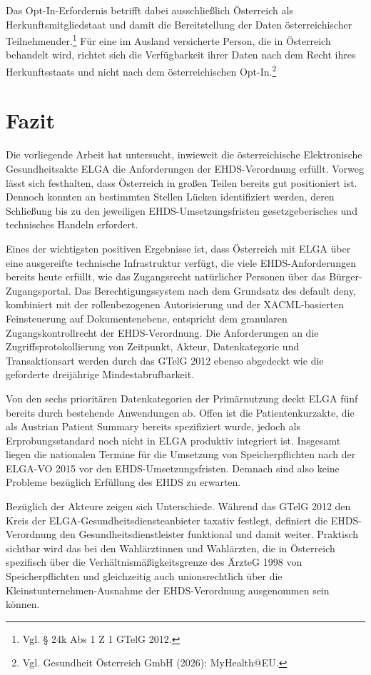 Das Opt-In-Erfordernis betrifft dabei ausschließlich Österreich als Herkunftsmitgliedstaat und damit die Bereitstellung der Daten österreichischer Teilnehmender.\footnote{Vgl. § 24k Abs 1 Z 1  GTelG 2012.} Für eine im Ausland versicherte Person, die in Österreich behandelt wird, richtet sich die Verfügbarkeit ihrer Daten nach dem Recht ihres Herkunftsstaats und nicht nach dem österreichischen Opt-In.\footnote{Vgl. Gesundheit Österreich GmbH (2026): MyHealth@EU.}




\chapter{Fazit}
Die vorliegende Arbeit hat untersucht, inwieweit die österreichische Elektronische Gesundheitsakte ELGA die Anforderungen der EHDS-Verordnung erfüllt. Vorweg lässt sich festhalten, dass Österreich in großen Teilen bereits gut positioniert ist. Dennoch konnten an bestimmten Stellen Lücken identifiziert werden, deren Schließung bis zu den jeweiligen EHDS-Umsetzungsfristen gesetzgeberisches und technisches Handeln erfordert.

Eines der wichtigsten positiven Ergebnisse ist, dass Österreich mit ELGA über eine ausgereifte technische Infrastruktur verfügt, die viele EHDS-Anforderungen bereits heute erfüllt, wie das Zugangsrecht natürlicher Personen über das Bürger-Zugangsportal.
Das Berechtigungssystem nach dem Grundsatz des default deny, kombiniert mit der rollenbezogenen Autorisierung und der XACML-basierten Feinsteuerung auf Dokumentenebene, entspricht dem granularen Zugangskontrollrecht der EHDS-Verordnung. Die Anforderungen an die Zugriffsprotokollierung von Zeitpunkt, Akteur, Datenkategorie und Transaktionsart werden durch das GTelG 2012 ebenso abgedeckt wie die geforderte dreijährige Mindestabrufbarkeit.

Von den sechs prioritären Datenkategorien der Primärnutzung deckt ELGA fünf bereits durch bestehende Anwendungen ab. Offen ist die Patientenkurzakte, die als Austrian Patient Summary bereits spezifiziert wurde, jedoch als Erprobungsstandard noch nicht in ELGA produktiv integriert ist. Insgesamt liegen die nationalen Termine für die Umsetzung von Speicherpflichten nach der ELGA-VO 2015 vor den EHDS-Umsetzungsfristen. Demnach sind also keine Probleme bezüglich Erfüllung des EHDS zu erwarten.

Bezüglich der Akteure zeigen sich Unterschiede. Während das GTelG 2012 den Kreis der ELGA-Gesundheitsdiensteanbieter taxativ festlegt, definiert die EHDS-Verordnung den Gesundheitsdienstleister funktional und damit weiter.
Praktisch sichtbar wird das bei den Wahlärztinnen und Wahlärzten, die in Österreich spezifisch über die Verhältnismäßigkeitsgrenze des ÄrzteG 1998 von Speicherpflichten und gleichzeitig auch unionsrechtlich über die Kleinstunternehmen-Ausnahme der EHDS-Verordnung ausgenommen sein können.

